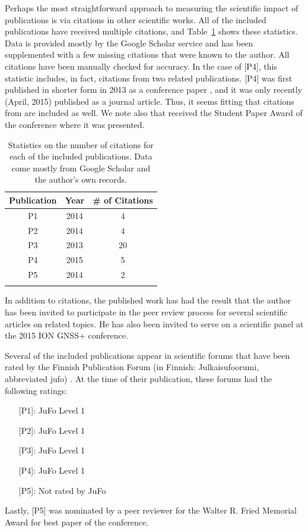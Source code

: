 Perhaps the most straightforward approach to measuring the scientific impact of publications is via citations in other scientific works. All of the included publications have received multiple citations, and Table~\ref{table:citations} shows these statistics. Data is provided mostly by the Google Scholar service and has been supplemented with a few missing citations that were known to the author. All citations have been manually checked for accuracy. In the case of [P4], this statistic includes, in fact, citations from two related publications. [P4] was first published in shorter form in 2013 as a conference paper \cite{Guinness2013}, and it was only recently (April, 2015) published as a journal article. Thus, it seems fitting that citations from \cite{Guinness2013} are included as well. We note also that \cite{Guinness2013} received the Student Paper Award of the conference where it was presented.
%
\begin{table}
\centering
\begin{tabular}{ccc}
\hline\noalign{\smallskip}
\textbf{Publication} & \textbf{Year} & \textbf{\# of Citations}\\
\hline\noalign{\smallskip}
P1 & 2014 & 4\\
P2 & 2014 & 4\\
P3 & 2013 & 20\\
P4 & 2015 & 5\\
P5 & 2014 & 2\\
\hline\noalign{\smallskip}
\end{tabular}
\caption[Citation statistics for included publications]{Statistics on the number of citations for each of the included publications. Data come mostly from Google Scholar and the author's own records.}\label{table:citations}
\end{table}
%
In addition to citations, the published work has had the result that the author has been invited to participate in the peer review process for several scientific articles on related topics. He has also been invited to serve on a scientific panel at the 2015 ION GNSS+ conference.

Several of the included publications appear in scientific forums that have been rated by the Finnish Publication Forum (in Finnish: Julkaisufoorumi, abbreviated \acrshort{jufo}) \cite{jufo}. At the time of their publication, these forums had the following ratings:

\begin{itemize}
  \setlength\itemsep{0em}
  \item[] [P1]: JuFo Level 1
  \item[] {[P2]}: JuFo Level 1
  \item[] {[P3]}: JuFo Level 1
  \item[] {[P4]}: JuFo Level 1
  \item[] {[P5]}: Not rated by JuFo
\end{itemize}


Lastly, [P5] was nominated by a peer reviewer for the Walter R. Fried Memorial Award for best paper of the conference.



